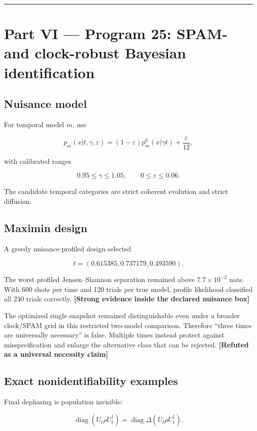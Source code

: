 \documentclass[11pt,a4paper,openany]{report}
\begin{document}
\par\medskip\hrule\medskip

\chapter{Part VI — Program 25: SPAM- and clock-robust Bayesian identification}

\section{Nuisance model}

For temporal model \(m\), use

\[
p_m(x|t,\gamma,\varepsilon)
=(1-\varepsilon)p_m^0(x|\gamma t)+\frac{\varepsilon}{12},
\]

with calibrated ranges

\[
0.95\le\gamma\le1.05,
\qquad
0\le\varepsilon\le0.06.
\]

The candidate temporal categories are strict coherent evolution and strict diffusion.

\section{Maximin design}

A greedy nuisance-profiled design selected

\[
t=(0.615385,0.737179,0.493590).
\]

The worst profiled Jensen–Shannon separation remained above \(7.7\times10^{-2}\) nats. With 600 shots per time and 120 trials per true model, profile likelihood classified all 240 trials correctly. \textbf{[Strong evidence inside the declared nuisance box]}

The optimized single snapshot remained distinguishable even under a broader clock/\allowbreak{}SPAM grid in this restricted two-model comparison. Therefore “three times are universally necessary” is false. Multiple times instead protect against misspecification and enlarge the alternative class that can be rejected. \textbf{[Refuted as a universal necessity claim]}

\section{Exact nonidentifiability examples}

Final dephasing is population invisible:

\[
\operatorname{diag}(U_t\rho U_t^\dagger)
=\operatorname{diag}\Delta(U_t\rho U_t^\dagger).
\]
\end{document}
